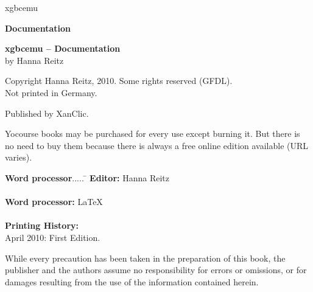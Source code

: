 \documentclass[fleqn,english,openany]{scrbook}
\date{}
\begin{document}
\pagestyle{empty}

\setlength{\parindent}{0mm}

\setcounter{page}{2}

\begin{titlepage}
\begin{center}

{\Huge xgbcemu} \vspace{10mm}

{\large {\bf Documentation}}

\end{center}

\newpage

{\bf xgbcemu -- Documentation} \\
by Hanna Reitz \vspace{5mm}

Copyright {\textcopyright} Hanna Reitz, 2010. Some rights reserved (GFDL). \\
Not printed in Germany. \vspace{5mm}

Published by XanClic. \vspace{5mm}

Yocourse books may be purchased for every use except burning it. But there is no need to buy them because there is always
a free online edition available (URL varies). \vspace{5mm}

\begin{tabbing}
{\large \bf Word processor}..... \= \kill
{\large \bf Editor:} \> Hanna Reitz \\ \\
{\large \bf Word processor:} \> \LaTeX \\ \\
{\large \bf Printing History:} \\
\hspace{5mm} April 2010: \> First Edition.
\end{tabbing}

\vspace{10mm}

While every precaution has been taken in the preparation of this book, the publisher and the authors assume no
responsibility for errors or omissions, or for damages resulting from the use of the information contained herein.

\end{titlepage}

\pagestyle{fancy}

\fancyhf{}
\end{document}
